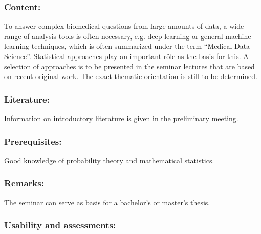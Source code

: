 \documentclass[a4paper,10pt]{article}
\begin{document}
\subsubsection*{\large
    Content:
}
To answer complex biomedical questions from large amounts of data, a wide range of analysis tools is often necessary, e.g. deep learning or general machine learning techniques, which is often summarized under the term ``Medical Data Science''. Statistical approaches play an important rôle as the basis for this. A selection of approaches is to be presented in the seminar lectures that are based on recent original work. The exact thematic orientation is still to be determined.
\subsubsection*{\large
    Literature:
}
Information on introductory literature is given in the preliminary meeting.
\subsubsection*{\large
    Prerequisites:
}
Good knowledge of probability theory and mathematical statistics.
\subsubsection*{\large
    Remarks:
}
The seminar can serve as basis for a bachelor's or master's thesis. 
\cleardoublepage
\subsubsection*{\large
    Usability and assessments:
}
\end{document}
